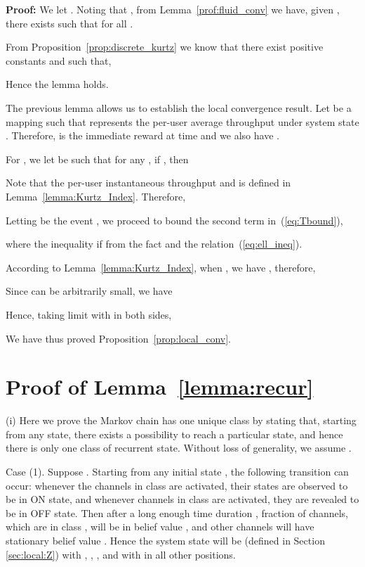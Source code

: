 \documentclass[11pt,twocolumn]{IEEEtran}
\begin{document}
\noindent \textbf{Proof:}
We let . Noting that , from Lemma~\ref{prof:fluid_conv} we have, given , there exists  such that for all .


From Proposition~\ref{prop:discrete_kurtz} we know that there exist positive constants  and  such that,


Hence the lemma holds. 
\vspace{3pt}

The previous lemma allows us to establish the local convergence result. Let  be a mapping such that  represents the per-user average throughput under system state . Therefore,  is the immediate reward at time  and we also have .

For , we let  be such that for any , if , then


Note that the per-user instantaneous throughput  and  is defined in Lemma~\ref{lemma:Kurtz_Index}. Therefore,


Letting  be the event , we proceed to bound the second term in~(\ref{eq:Tbound}),

where the inequality if from the fact  and the relation~(\ref{eq:ell_ineq}).

According to Lemma~\ref{lemma:Kurtz_Index}, when , we have , therefore,


Since  can be arbitrarily small, we have


Hence, taking limit with  in both sides,


We have thus proved Proposition~\ref{prop:local_conv}.

\section{Proof of Lemma~\ref{lemma:recur}}
\label{appen:recur}

(i) Here we prove the Markov chain has one unique class by stating that, starting from any state, there exists a possibility to reach a particular state, and hence there is only one class of recurrent state. Without loss of generality, we assume .

Case (1). Suppose .  Starting from any initial state , the following transition can occur: whenever the channels in class  are activated, their states are observed to be in ON state, and whenever channels in class  are activated, they are revealed to be in OFF state. Then after a long enough time duration ,  fraction of channels, which are in class , will be in belief value , and other channels will have stationary belief value . Hence the system state will be  (defined in Section \ref{sec:local:Z}) with , , , and with  in all other positions.
\end{document}
